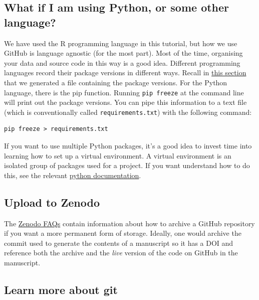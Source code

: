 \documentclass[11pt,onecolumn]{scrartcl}
\begin{document}
\subsection{What if I am using Python, or some other language?}
\label{sec:orgb51dd91}

We have used the R programming language in this tutorial, but how we use GitHub
is language agnostic (for the most part). Most of the time, organising your data
and source code in this way is a good idea. Different programming languages
record their package versions in different ways. Recall in \hyperref[sec:orgab3fce7]{this section} that we
generated a file containing the package versions. For the Python language, there
is the pip function. Running \texttt{pip freeze} at the command line will print out the
package versions. You can pipe this information to a text file (which is
conventionally called \texttt{requirements.txt}) with the following command:

\lstset{language=sh,label= ,caption= ,captionpos=b,numbers=none}
\begin{lstlisting}
pip freeze > requirements.txt
\end{lstlisting}

If you want to use multiple Python packages, it's a good idea to invest time
into learning how to set up a virtual environment. A virtual environment is an
isolated group of packages used for a project. If you want understand how to do
this, see the relevant \href{https://docs.python.org/3/tutorial/venv.html}{python documentation}.

\subsection{Upload to Zenodo}
\label{sec:org303ed6c}

The \href{https://help.zenodo.org/}{Zenodo FAQs} contain information about how to archive a GitHub repository if
you want a more permanent form of storage. Ideally, one would archive the commit
used to generate the contents of a manuscript so it has a DOI and reference both
the archive and the \emph{live} version of the code on GitHub in the manuscript.

\subsection{Learn more about git}
\label{sec:org120c1a0}
\end{document}
